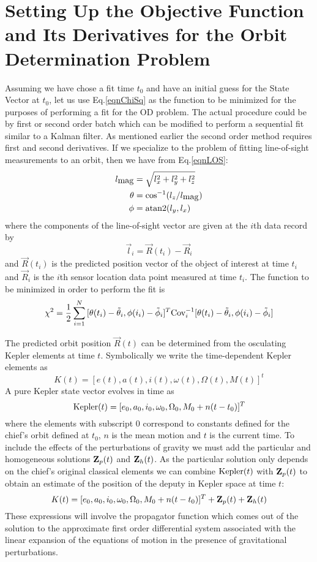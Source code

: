 \section{Setting Up the Objective Function and Its Derivatives for the Orbit Determination Problem}

Assuming we have chose a fit time $t_0$ and have an initial guess for the State Vector at $t_0$, let us use Eq.\eqref{eqnChiSq} as the function to be minimized for the purposes of performing a fit for the OD problem. The actual procedure could be by first or second order batch which can be modified to perform a sequential fit similar to a Kalman filter. As mentioned earlier the second order method requires first and second derivatives. If we specialize to the problem of fitting line-of-sight measurements to an orbit, then we have from Eq.\eqref{eqnLOS}:
\begin{align*}
l_{\hbox{mag}} &= \sqrt{l_x^2 + l_y^2 + l_z^2}\\
\theta               &= \cos^{-1}(l_z/l_{\hbox{mag}})\\
\phi                  &= \hbox{atan2}(l_y,l_x)\\
\end{align*}where the components of the line-of-sight vector are given at the $i$th data record by
$$\vec{l}_i = \vec{R}(t_i) - \vec{R}_i$$and $\vec{R}(t_i)$ is the predicted position vector of the object of interest at time $t_i$ and $\vec{R}_i$ is the $i$th sensor location data point measured at time $t_i$. The function to be minimized in order to perform the fit is 
\begin{align*}\chi^2 = {1\over2}\sum_{i=1}^N\, [\theta(t_i) - \tilde\theta_i, \phi(i_i) - \tilde\phi_i]^T \hbox{Cov}_i^{-1}[\theta(t_i) - \tilde\theta_i, \phi(i_i) - \tilde\phi_i]\end{align*}


The predicted orbit position $\vec{R}(t)$ can be determined from the osculating Kepler elements at time $t$. Symbolically we write the time-dependent Kepler elements as
$$K(t) = [e(t), a(t), i(t), \omega(t), \Omega(t), M(t)]^t$$A pure Kepler state vector evolves in time as 
$$\hbox{Kepler}(t) = [e_0,a_0,i_0,\omega_0,\Omega_0, M_0 + n(t-t_0)]^T$$where the elements with subscript $0$ correspond to constants defined for the chief's orbit defined at $t_0$, $n$ is
the mean motion and $t$ is the current time. To include the effects of the perturbations of gravity we must add the particular and homogeneous solutions ${\bf Z}_p(t)$ and ${\bf Z}_h(t)$. 
As the particular solution only depends on the chief's original classical elements we can combine $\hbox{Kepler}(t)$ with ${\bf Z}_p(t)$ to obtain an estimate of the position of the deputy in
Kepler space at time $t$: $$K(t) = [e_0,a_0,i_0,\omega_0,\Omega_0, M_0 + n(t-t_0)]^T + {\bf Z}_p(t) + {\bf Z}_h(t)$$These expressions will involve the propagator function which comes out
of the solution to the approximate first order differential system associated with the linear expansion of the equations of motion in the presence of gravitational perturbations. \\

